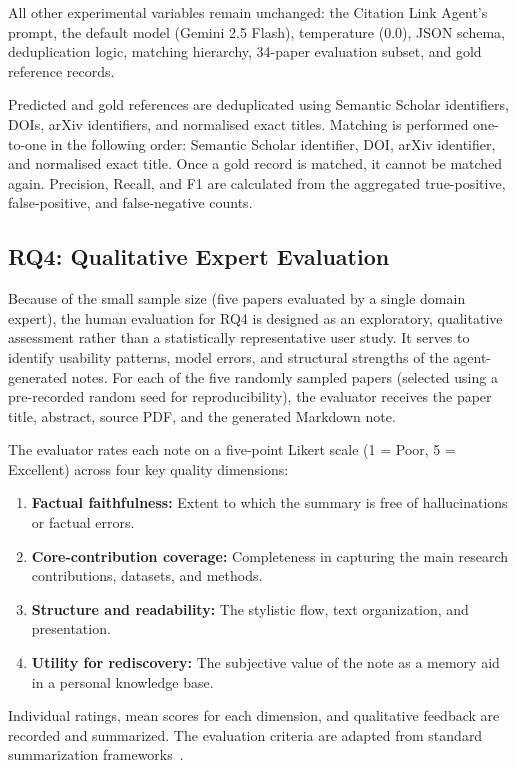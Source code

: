 \documentclass[runningheads]{llncs}
\begin{document}
All other experimental variables remain unchanged: the Citation Link Agent's prompt, the default model (Gemini 2.5 Flash), temperature (0.0), JSON schema, deduplication logic, matching hierarchy, 34-paper evaluation subset, and gold reference records.

Predicted and gold references are deduplicated using Semantic Scholar identifiers, DOIs, arXiv identifiers, and normalised exact titles. Matching is performed one-to-one in the following order: Semantic Scholar identifier, DOI, arXiv identifier, and normalised exact title. Once a gold record is matched, it cannot be matched again. Precision, Recall, and F1 are calculated from the aggregated true-positive, false-positive, and false-negative counts.

\subsection{RQ4: Qualitative Expert Evaluation}
\label{sec:rq4_method}

Because of the small sample size (five papers evaluated by a single domain expert), the human evaluation for RQ4 is designed as an exploratory, qualitative assessment rather than a statistically representative user study. It serves to identify usability patterns, model errors, and structural strengths of the agent-generated notes. For each of the five randomly sampled papers (selected using a pre-recorded random seed for reproducibility), the evaluator receives the paper title, abstract, source PDF, and the generated Markdown note.

The evaluator rates each note on a five-point Likert scale (1 = Poor, 5 = Excellent) across four key quality dimensions:
\begin{enumerate}
    \item \textbf{Factual faithfulness:} Extent to which the summary is free of hallucinations or factual errors.
    \item \textbf{Core-contribution coverage:} Completeness in capturing the main research contributions, datasets, and methods.
    \item \textbf{Structure and readability:} The stylistic flow, text organization, and presentation.
    \item \textbf{Utility for rediscovery:} The subjective value of the note as a memory aid in a personal knowledge base.
\end{enumerate}
Individual ratings, mean scores for each dimension, and qualitative feedback are recorded and summarized. The evaluation criteria are adapted from standard summarization frameworks~\cite{fabbri2021summeval}.
\end{document}
